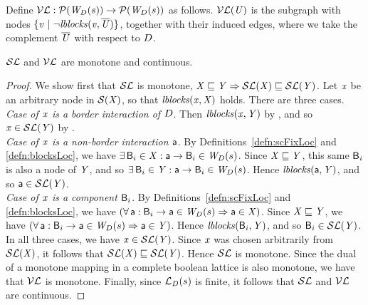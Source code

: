 \begin{definition}[$\lVFs$] \label{defn:violFixLoc}
Define $\lVFs: \lwfgS{B}{s}{\DS}  \to  \lwfgS{B}{s}{\DS}$ as follows.
$\lVF{\US}$ is the subgraph with nodes $\set{\ndv \stt \neg \lblocks{\ndv}{\compl{\US}} }$, together with their induced edges, 
where we take the complement $\compl{\US}$ with respect to $\DS$.
\end{definition}

\begin{proposition} \label{prop:monotoneLoc}
$\lSFs$ and $\lVFs$ are monotone and continuous.
\end{proposition}
%
\begin{proof}
We show first that $\lSFs$ is monotone, \ie $\XS \subg \YS \imp \lSF{\XS} \subg \lSF{\YS}$.
Let $\ndx$ be an arbitrary node in $\SF{\XS}$, so that $\lblocks{\ndx}{\XS}$ holds. There are three cases.\\

\emph{Case of $\ndx$ is a border interaction of $\DS$}. Then $\lblocks{\ndx}{\YS}$ by , and so $\ndx \in  \lSF{\YS}$ by
.\\

\emph{Case of $\ndx$ is a non-border interaction $\act$}. By Definitions~\ref{defn:scFixLoc} and \ref{defn:blocksLoc}, we have
$\ex \B_i \in \XS  : \act \ar \B_i \in \lwfg{B}{s}{\DS}$.
Since $\XS \subg \YS$, this same $\B_i$ is also a node of $\YS$, and so  $\ex \B_i \in \YS  : \act \ar \B_i \in \lwfg{B}{s}{\DS}$. 
Hence  $\lblocks{\act}{\YS}$, and so $\act \in \lSF{\YS}$. \\

\emph{Case of $\ndx$ is a component $\B_i$}. By Definitions~\ref{defn:scFixLoc} and \ref{defn:blocksLoc}, we have
$(\fa \act : \B_i \ar \act \in \lwfg{B}{s}{\DS} \imp \act \in \XS)$.
Since $\XS \subg \YS$, we have  $(\fa \act : \B_i \ar \act \in \lwfg{B}{s}{\DS} \imp \act \in \YS)$. 
Hence $\lblocks{\B_i}{\YS}$, and so $\B_i \in \lSF{\YS}$. \\

In all three cases, we have $\ndx \in \lSF{\YS}$. Since $\ndx$ was chosen arbitrarily from $\lSF{\XS} $, it follows that $\lSF{\XS} \subg \lSF{\YS}$. Hence
$\lSFs$ is monotone.
%
Since the dual of a monotone mapping in a complete boolean lattice is also monotone, we have that $\lVFs$ is monotone.
%
Finally, since $\llat{\B}{s}{\DS}$ is finite, it follows that $\lSFs$ and $\lVFs$ are continuous.
\end{proof}




